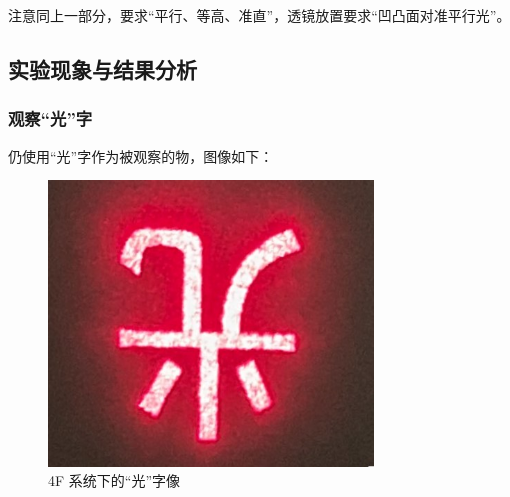 \documentclass[UTF8]{article}
\theoremstyle{MyLineTheoremStyle} %
\theoremstyle{MyBlockTheoremStyle} %
\theoremstyle{MySubsubsectionStyle} %
\begin{document}
注意同上一部分，要求“平行、等高、准直”，透镜放置要求“凹凸面对准平行光”。


\subsection{实验现象与结果分析}

\subsubsection{观察“光”字}

仍使用“光”字作为被观察的物，图像如下：
\begin{figure}[H]\centering
    \includegraphics[height=215pt]{assets/2 透镜4F/光 透镜4F.jpg}
    \caption{4F 系统下的“光”字像}
\end{figure}
\end{document}
